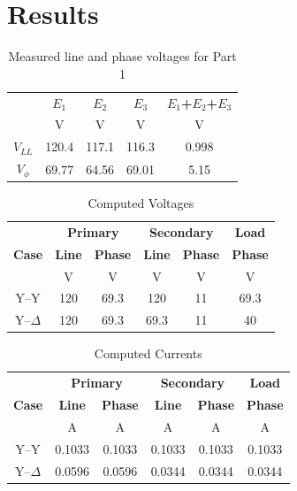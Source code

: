 \documentclass{article}
\begin{document}
\section{Results}

\begin{table}[H]
  \centering
  \begin{tabular}{*{5}{c}}
    & \textbf{$E_1$} & \textbf{$E_2$} & \textbf{$E_3$} & \textbf{$E_1$+$E_2$+$E_3$} \\
    & V & V & V & V \\

    \hline

    \textbf{$V_{LL}$} & 120.4 & 117.1 & 116.3 & 0.998 \\
    \textbf{$V_{\phi}$} & 69.77 & 64.56 & 69.01 & 5.15 \\
  \end{tabular}
  \caption{Measured line and phase voltages for Part 1}
  \label{tab:3phase_source}
\end{table}

\begin{table}[H]
  \centering
  \begin{tabular}{*{6}{c}}

    & \multicolumn{2}{c}{\textbf{Primary}} &
    \multicolumn{2}{c}{\textbf{Secondary}} & \textbf{Load} \\

    \textbf{Case} & \textbf{Line} & \textbf{Phase} & \textbf{Line} &
    \textbf{Phase} & \textbf{Phase} \\

    & V & V & V & V & V \\
    \hline

    Y--Y        & 120 & 69.3 & 120 & 11 & 69.3 \\
    Y--$\Delta$ & 120 & 69.3 & 69.3 & 11 & 40 \\
  \end{tabular}
  \caption{Computed Voltages}
  \label{tab:volt_comp}
\end{table}

\begin{table}[H]
  \centering
  \begin{tabular}{*{6}{c}}
    & \multicolumn{2}{c}{\textbf{Primary}}
    & \multicolumn{2}{c}{\textbf{Secondary}} & \textbf{Load} \\

    \textbf{Case} & \textbf{Line} & \textbf{Phase} & \textbf{Line} &
    \textbf{Phase} & \textbf{Phase} \\

    & A & A & A & A & A \\
    \hline

    Y--Y        & 0.1033 & 0.1033 & 0.1033 & 0.1033 & 0.1033 \\
    Y--$\Delta$ & 0.0596 & 0.0596 & 0.0344 & 0.0344 & 0.0344 \\
  \end{tabular}
  \caption{Computed Currents}
  \label{tab:curr_comp}
\end{table}
\end{document}
